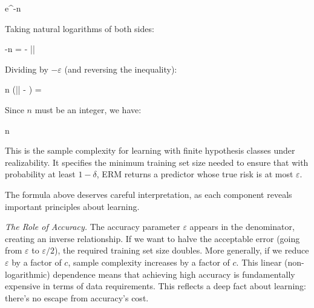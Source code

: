 \begin{myequation}
e^{-\varepsilon n} \le {}
\end{myequation}

Taking natural logarithms of both sides:

\begin{myequation}
-\varepsilon n \le \ln{} = \ln \delta - \ln||
\end{myequation}

Dividing by $-\varepsilon$ (and reversing the inequality):

\begin{myequation}
n \ge {}(\ln|| - \ln\delta) = \ln{}
\end{myequation}

Since $n$ must be an integer, we have:

\begin{myequation}\label{eq:sample-complexity-finite}
n \ge \left\lceil {}\ln{}\right\rceil
\end{myequation}

This is the \alert{sample complexity} for learning with finite hypothesis classes under realizability. It specifies the minimum training set size needed to ensure that with probability at least $1 - \delta$, ERM returns a predictor whose true risk is at most $\varepsilon$.


The formula above deserves careful interpretation, as each component reveals important principles about learning.

\emph{The Role of Accuracy.} The accuracy parameter $\varepsilon$ appears in the denominator, creating an inverse relationship. If we want to halve the acceptable error (going from $\varepsilon$ to $\varepsilon/2$), the required training set size doubles. More generally, if we reduce $\varepsilon$ by a factor of $c$, sample complexity increases by a factor of $c$. This linear (non-logarithmic) dependence means that achieving high accuracy is fundamentally expensive in terms of data requirements. This reflects a deep fact about learning: there's no escape from accuracy's cost.


